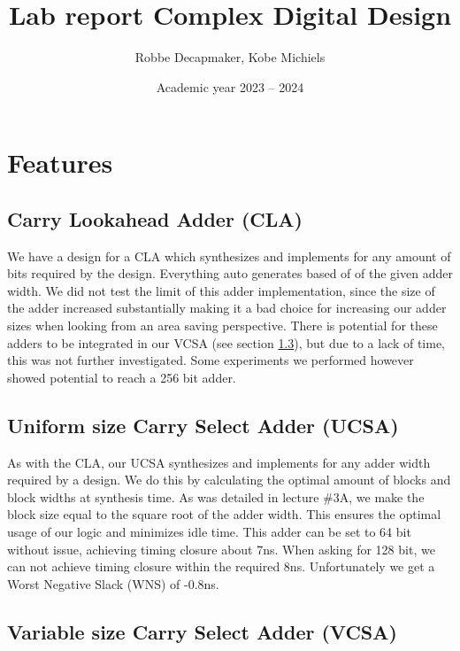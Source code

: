 \documentclass[a4paper,kul]{kulakarticle} %
\date{Academic year 2023 -- 2024}
\title{Lab report Complex Digital Design}
\author{Robbe Decapmaker, Kobe Michiels}
\begin{document}
\maketitle
\section{Features}


\subsection{Carry Lookahead Adder (CLA)}

We have a design for a CLA which synthesizes and implements for any amount of bits required by the design. Everything auto generates based of of the given adder width. We did not test the limit of this adder implementation, since the size of the adder increased substantially making it a bad choice for increasing our adder sizes when looking from an area saving perspective. There is potential for these adders to be integrated in our VCSA (see section \ref{sec:VCSA}), but due to a lack of time, this was not further investigated. Some experiments we performed however showed potential to reach a 256 bit adder. 

\subsection{Uniform size Carry Select Adder (UCSA)}

As with the CLA, our UCSA synthesizes and implements for any adder width required by a design. We do this by calculating the optimal amount of blocks and block widths at synthesis time. As was detailed in lecture \#3A, we make the block size equal to the square root of the adder width. This ensures the optimal usage of our logic and minimizes idle time. This adder can be set to 64 bit without issue, achieving timing closure about 7ns. When asking for 128 bit, we can not achieve timing closure within the required 8ns. Unfortunately we get a Worst Negative Slack (WNS) of -0.8ns. 

\subsection{Variable size Carry Select Adder (VCSA)}
\label{sec:VCSA}
\end{document}
